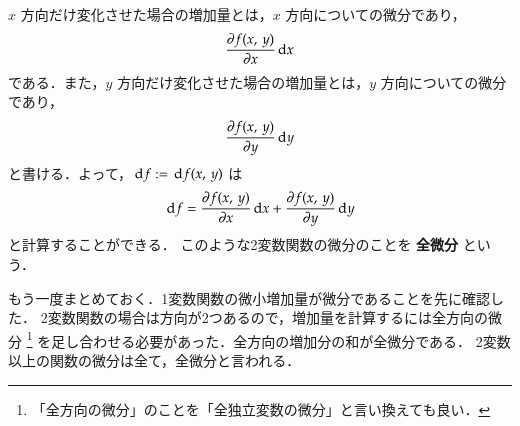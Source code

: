                 $x$ 方向だけ変化させた場合の増加量とは，$x$ 方向についての微分であり，
                \begin{equation*}
                     \frac{\partial f(x,\,y)}{\partial x} \,\mathrm{d} x
               \end{equation*}
                である．また，$y$ 方向だけ変化させた場合の増加量とは，$y$ 方向についての微分であり，
                \begin{equation*}
                    \frac{\partial f(x,\,y)}{\partial y} \,\mathrm{d} y
                \end{equation*}
                と書ける．よって，$\,\mathrm{d} f:=\,\mathrm{d} f(x,\,y)$ は
                \begin{align}
                        \,\mathrm{d} f = \frac{\partial f(x,\,y)}{\partial x} \,\mathrm{d} x + \frac{\partial f(x,\,y)}{\partial y} \,\mathrm{d} y
                \end{align}
                と計算することができる．
                このような2変数関数の微分のことを \textbf{全微分} という．

                もう一度まとめておく．1変数関数の微小増加量が微分であることを先に確認した．
                2変数関数の場合は方向が2つあるので，増加量を計算するには全方向の微分
                \footnote{
                    「全方向の微分」のことを「全独立変数の微分」と言い換えても良い．
                }
                を足し合わせる必要があった．全方向の増加分の和が全微分である．
                2変数以上の関数の微分は全て，全微分と言われる．

                

